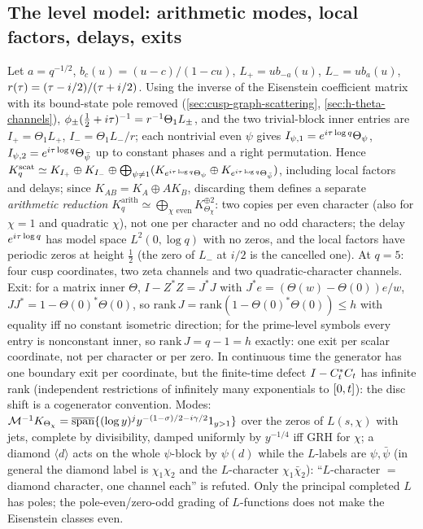 \subsection{The level model: arithmetic modes, local factors, delays, exits}

\begin{theorem}
\label{thm:level-model-decomposition}
Let $a = q^{-1/2}$, $b_c(u) = (u-c)/(1-cu)$, $L_+ = ub_{-a}(u)$, $L_- = ub_a(u)$, $r(\tau) = (\tau-i/2)/(\tau+i/2)$. Using the
inverse of the Eisenstein coefficient matrix with its bound-state pole removed (\cref{sec:cusp-graph-scattering},
\cref{sec:h-theta-channels}), $\phi_\pm(\tfrac12+i\tau)^{-1} = r^{-1}\Theta_1L_\pm$, and the two trivial-block inner entries are
$I_+ = \Theta_1L_+$, $I_- = \Theta_1L_-/r$; each nontrivial even $\psi$ gives $I_{\psi,1} = e^{i\tau\log q}\Theta_\psi$,
$I_{\psi,2} = e^{i\tau\log q}\Theta_{\bar\psi}$ up to constant phases and a right permutation. Hence
$K^{\mathrm{scat}}_q\simeq K_{I_+}\oplus K_{I_-}\oplus\bigoplus_{\psi\ne1}(K_{e^{i\tau\log q}\Theta_\psi}\oplus K_{e^{i\tau\log q}\Theta_{\bar\psi}})$,
including local factors and delays; since $K_{AB} = K_A\oplus AK_B$, discarding them defines a separate \emph{arithmetic
reduction} $K^{\mathrm{arith}}_q\simeq\bigoplus_{\chi\text{ even}}K_{\Theta_\chi}^{\oplus2}$: two copies per even character
(also for $\chi = 1$ and quadratic $\chi$), not one per character and no odd characters; the delay $e^{i\tau\log q}$ has model
space $L^2(0,\log q)$ with no zeros, and the local factors have periodic zeros at height $\tfrac12$ (the zero of $L_-$ at
$i/2$ is the cancelled one). At $q = 5$: four cusp coordinates, two zeta channels and two quadratic-character channels.
Exit: for a matrix inner $\Theta$, $I-Z^{*}Z = J^{*}J$ with $J^{*}e = (\Theta(w)-\Theta(0))e/w$, $JJ^{*} = 1-\Theta(0)^{*}\Theta(0)$, so
$\mathrm{rank}\,J = \mathrm{rank}(1-\Theta(0)^{*}\Theta(0))\le h$ with equality iff no constant isometric direction; for the
prime-level symbols every entry is nonconstant inner, so $\mathrm{rank}\,J = q-1 = h$ exactly: one exit per scalar coordinate,
not per character or per zero. In continuous time the generator has one boundary exit per coordinate, but the finite-time
defect $I-C_t^{*}C_t$ has infinite rank (independent restrictions of infinitely many exponentials to $[0,t]$): the
disc shift is a cogenerator convention. Modes: $\mathcal M^{-1}K_{\Theta_\chi} = \overline{\mathrm{span}}\{(\log y)^jy^{-(1-\sigma)/2-i\gamma/2}1_{y>1}\}$
over the zeros of $L(s,\chi)$ with jets, complete by divisibility, damped uniformly by $y^{-1/4}$ iff GRH for $\chi$; a
diamond $\langle d\rangle$ acts on the whole $\psi$-block by $\psi(d)$ while the $L$-labels are $\psi,\bar\psi$ (in general the
diamond label is $\chi_1\chi_2$ and the $L$-character $\chi_1\bar\chi_2$): ``$L$-character $=$ diamond character, one channel
each'' is refuted. Only the principal completed $L$ has poles; the pole-even/zero-odd grading of $L$-functions does not
make the Eisenstein classes even.
\end{theorem}

